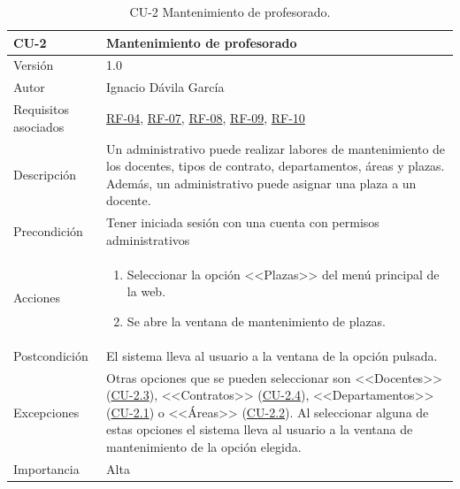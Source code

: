 \begin{table}[p]
	\centering
	\begin{tabularx}{\linewidth}{ p{} p{} }
		\toprule
		\textbf{CU-2}    & \textbf{Mantenimiento de profesorado}\\
		\toprule
		{\small Versión}              & 1.0    \\
		{\small Autor}                & Ignacio Dávila García \\
		{\small Requisitos asociados} & \hyperref[itm:RF4]{RF-04}, \hyperref[itm:RF7]{RF-07}, \hyperref[itm:RF8]{RF-08}, \hyperref[itm:RF9]{RF-09}, \hyperref[itm:RF10]{RF-10} \\
		{\small Descripción}          & Un administrativo puede realizar labores de mantenimiento de los docentes, tipos de contrato, departamentos, áreas y plazas. Además, un administrativo puede asignar una plaza a un docente. \\
		{\small Precondición}         & Tener iniciada sesión con una cuenta con permisos administrativos \\
		{\small Acciones}             &
		\begin{enumerate}
			\def\labelenumi{\arabic{enumi}.}
			\tightlist
			\item Seleccionar la opción <<Plazas>> del menú principal de la web.
			\item Se abre la ventana de mantenimiento de plazas.
		\end{enumerate}\\
		{\small Postcondición}        & El sistema lleva al usuario a la ventana de la opción pulsada. \\
		{\small Excepciones}          & Otras opciones que se pueden seleccionar son <<Docentes>> (\hyperref[table:CU-2_3]{CU-2.3}), <<Contratos>> (\hyperref[table:CU-2_4]{CU-2.4}), <<Departamentos>> (\hyperref[table:CU-2_1]{CU-2.1}) o <<Áreas>> (\hyperref[table:CU-2_2]{CU-2.2}). Al seleccionar alguna de estas opciones el sistema lleva al usuario a la ventana de mantenimiento de la opción elegida.  \\
		{\small Importancia}          & Alta \\
		\bottomrule
	\end{tabularx}
	\caption{CU-2 Mantenimiento de profesorado.}\label{table:CU-2}
\end{table}
\FloatBarrier

